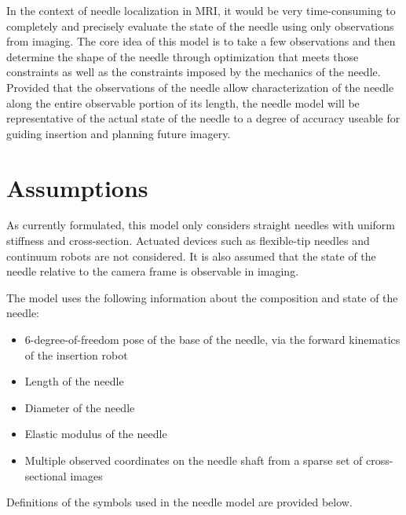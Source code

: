 In the context of needle localization in MRI, it would be very time-consuming to completely and precisely evaluate the state of the needle using only observations from imaging. The core idea of this model is to take a few observations and then determine the shape of the needle through optimization that meets those constraints as well as the constraints imposed by the mechanics of the needle. Provided that the observations of the needle allow characterization of the needle along the entire observable portion of its length, the needle model will be representative of the actual state of the needle to a degree of accuracy useable for guiding insertion and planning future imagery.

\section{Assumptions}
As currently formulated, this model only considers straight needles with uniform stiffness and cross-section. Actuated devices such as flexible-tip needles and continuum robots are not considered. It is also assumed that the state of the needle relative to the camera frame is observable in imaging.

The model uses the following information about the composition and state of the needle:
\begin{itemize}
\item 6-degree-of-freedom pose of the base of the needle, via the forward kinematics of the insertion robot
\item Length of the needle
\item Diameter of the needle
\item Elastic modulus of the needle
\item Multiple observed coordinates on the needle shaft from a sparse set of cross-sectional images
\end{itemize}

Definitions of the symbols used in the needle model are provided below.

